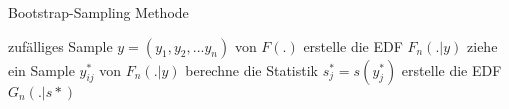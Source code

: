 \begin{algorithm} 
  \caption{Bootstrap-Sampling Methode} 
  \label{algo:bootstrap} 

  \begin{algorithmic}
    \REQUIRE zufälliges Sample $y = (y_1, y_2, ...y_n)$ von $F(.)$
    \STATE erstelle die EDF $F_n(.|y)$
			  \STATE ziehe ein Sample $y^*_{ij}$ von $F_n(.|y)$
			\ENDFOR
			\STATE berechne die Statistik $s^*_j = s(y^*_j)$
		\ENDFOR
		\STATE erstelle die EDF $G_n(.|s*)$ 
  \end{algorithmic}
\end{algorithm} 
























